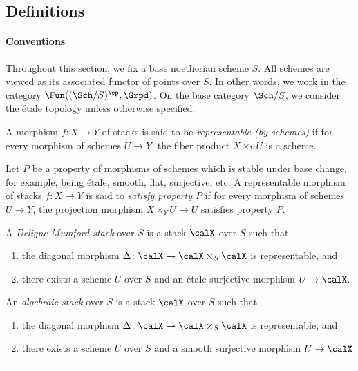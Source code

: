 \subsection{Definitions}

    \paragraph{Conventions} Throughout this section, we fix a base noetherian scheme \(S\).
    All schemes are viewed as its associated functor of points over \(S\).
    In other words, we work in the category \(\Fun((\Sch/S)^{\op}, \Grpd)\).
    On the base category \(\Sch/S\), we consider the \'etale topology unless otherwise specified.

    \begin{definition}\label{def:representable_morphisms_of_stacks}
        A morphism \(f \colon X \to Y\) of stacks is said to be \emph{representable (by schemes)} if for every morphism of schemes \(U \to Y\), 
        the fiber product \(X \times_Y U\) is a scheme.
    \end{definition}

    \begin{definition}\label{def:properties_of_representable_morphisms_of_stacks}
        Let \(P\) be a property of morphisms of schemes which is stable under base change, for example, being \'etale, smooth, flat, surjective, etc.
        A representable morphism of stacks \(f \colon X \to Y\) is said to \emph{satisfy property \(P\)} if for every morphism of schemes \(U \to Y\), 
        the projection morphism \(X \times_Y U \to U\) satisfies property \(P\).
    \end{definition}

    \begin{definition}\label{def:Deligne-Mumford_stacks}
        A \emph{Deligne-Mumford stack} over \(S\) is a stack \(\calX\) over \(S\) such that
        \begin{enumerate}
            \item the diagonal morphism \(\Delta \colon \calX \to \calX \times_S \calX\) is representable, and
            \item there exists a scheme \(U\) over \(S\) and an \'etale surjective morphism \(U \to \calX\).
        \end{enumerate}
    \end{definition}

    \begin{definition}\label{def:algebraic_stacks}
        An \emph{algebraic stack} over \(S\) is a stack \(\calX\) over \(S\) such that
        \begin{enumerate}
            \item the diagonal morphism \(\Delta \colon \calX \to \calX \times_S \calX\) is representable, and
            \item there exists a scheme \(U\) over \(S\) and a smooth surjective morphism \(U \to \calX\).
        \end{enumerate}
    \end{definition}

